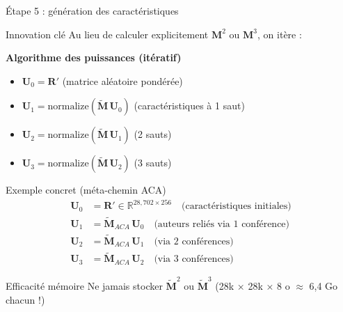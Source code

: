 \documentclass[9pt,aspectratio=169,professionalfonts]{beamer}
\begin{document}
\begin{frame}{Étape 5 : génération des caractéristiques}
\begin{block}{Innovation clé}
Au lieu de calculer explicitement $\mathbf M^2$ ou $\mathbf M^3$, on itère :
\end{block}

\textbf{Algorithme des puissances (itératif)}
\begin{itemize}
    \item $\mathbf U_0 = \mathbf R'$ \quad (matrice aléatoire pondérée)
    \item $\mathbf U_1 = \text{normalize}(\tilde{\mathbf M}\,\mathbf U_0)$ \quad (caractéristiques à 1 saut)
    \item $\mathbf U_2 = \text{normalize}(\tilde{\mathbf M}\,\mathbf U_1)$ \quad (2 sauts)
    \item $\mathbf U_3 = \text{normalize}(\tilde{\mathbf M}\,\mathbf U_2)$ \quad (3 sauts)
\end{itemize}

\begin{exampleblock}{Exemple concret (méta-chemin ACA)}
\begin{align*}
\mathbf U_0 &= \mathbf R' \in \mathbb R^{28,702\times256} \quad \text{(caractéristiques initiales)}\\
\mathbf U_1 &= \tilde{\mathbf M}_{ACA}\,\mathbf U_0 \quad \text{(auteurs reliés via 1 conférence)}\\
\mathbf U_2 &= \tilde{\mathbf M}_{ACA}\,\mathbf U_1 \quad \text{(via 2 conférences)}\\
\mathbf U_3 &= \tilde{\mathbf M}_{ACA}\,\mathbf U_2 \quad \text{(via 3 conférences)}
\end{align*}
\end{exampleblock}

\begin{alertblock}{Efficacité mémoire}
Ne jamais stocker $\tilde{\mathbf M}^2$ ou $\tilde{\mathbf M}^3$ (28k × 28k × 8 o $\approx$ 6,4 Go chacun !)
\end{alertblock}
\end{frame}
\end{document}
